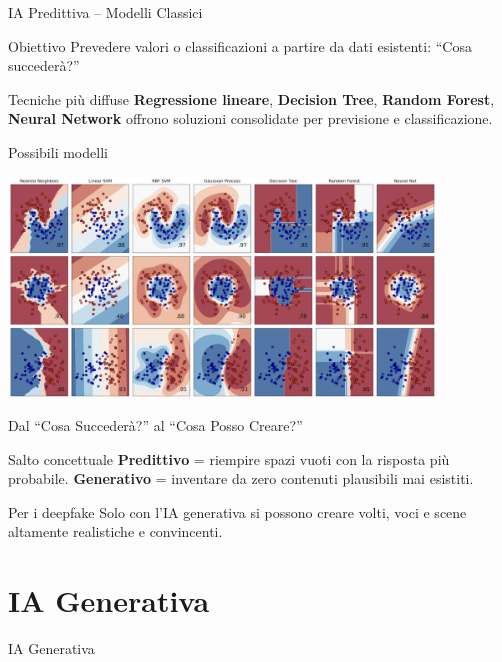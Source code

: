 \documentclass[12pt]{beamer}
\begin{document}
\begin{frame}{IA Predittiva – Modelli Classici}
  \begin{alertblock}{Obiettivo}
    Prevedere valori o classificazioni a partire da dati esistenti: “Cosa succederà?”
  \end{alertblock}
  \begin{alertblock}{Tecniche più diffuse}
    \textbf{Regressione lineare}, \textbf{Decision Tree}, \textbf{Random Forest}, \textbf{Neural Network} offrono soluzioni consolidate per previsione e classificazione.
  \end{alertblock}
\end{frame}


\begin{frame}{Possibili modelli \cite{scikit}}
  \begin{center}
    \includegraphics[width=0.85\textwidth]{Pic/dec.png}
  \end{center}
\end{frame}

\begin{frame}{Dal “Cosa Succederà?” al “Cosa Posso Creare?”}
  \begin{alertblock}{Salto concettuale}
    \textbf{Predittivo} = riempire spazi vuoti con la risposta più probabile.  
    \textbf{Generativo} = inventare da zero contenuti plausibili mai esistiti.
  \end{alertblock}
  \begin{alertblock}{Per i deepfake}
    Solo con l’IA generativa si possono creare volti, voci e scene altamente realistiche e convincenti.
  \end{alertblock}
\end{frame}

\section{IA Generativa}
\begin{frame}
\Huge
\begin{center}
IA Generativa
\end{center}
\end{frame}
\end{document}
